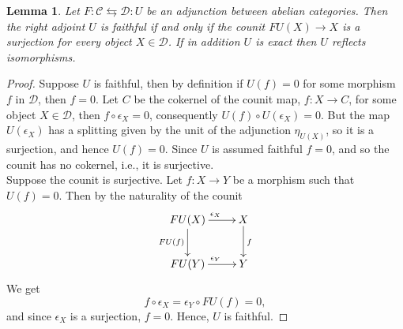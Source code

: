 \documentclass[11pt]{book}
\newtheorem{Lem}[theorem]{Lemma}
\theoremstyle{Rem}
\theoremstyle{definition}
\numberwithin{equation}{section}
\newcommand\C{\mathcal C}
\newcommand\D{\mathcal D}
\begin{document}
\iffalse
\begin{Lem}
Let $F:\C \leftrightarrows \D: U$ be an adjunction between abelian categories. Then the right adjoint $U$ is faithful if and only if the counit $FU(X)\rightarrow X$ is a surjection for every object $X \in \D$. If in addition $U$ is exact then $U$ reflects isomorphisms.
\end{Lem}
\begin{proof}
Suppose $U$ is faithful, then by definition if $U(f) = 0$ for some morphism $f$ in $\D$, then $f=0$. Let $C$ be the cokernel of the counit map, $f: X \rightarrow C$, for some object $X\in \D$, then $f\circ \epsilon_X = 0$, consequently $U(f)\circ U(\epsilon_X) = 0$.  But the map $U(\epsilon_X)$ has a splitting given by the unit of the adjunction $\eta_{U(X)}$, so it is a surjection, and hence $U(f)=0$. Since $U$ is assumed faithful $f=0$, and so the counit has no cokernel, i.e., it is surjective. \\
Suppose the counit is surjective. Let $f:X\rightarrow Y$ be a morphism such that $U(f)=0$. Then by the naturality of the counit \begin{equation}
	\xymatrix{
	FU(X) \ar[d]_{FU(f)} \ar[r]^{\epsilon_X} & X \ar[d]^{f} \\
	FU(Y) \ar[r]^{\epsilon_Y} & Y
	}
\end{equation}                                                                                                             We get \begin{equation}
	f\circ \epsilon_X = \epsilon_Y \circ FU(f) = 0,
\end{equation}                                
and since $\epsilon_X$ is a surjection, $f=0$. Hence, $U$ is faithful.        
\end{proof}
\end{document}
